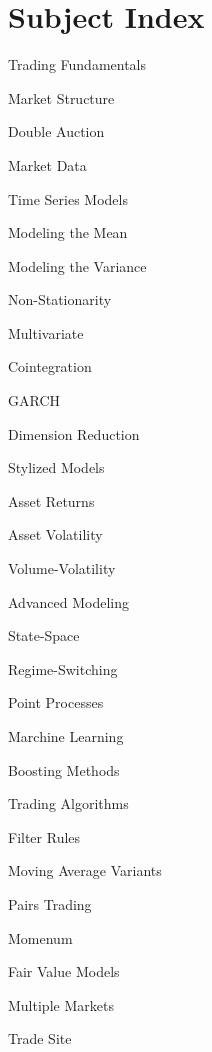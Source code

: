 \chapter*{Subject Index}

\begin{minipage}{0.35\textwidth}
\noindent Trading Fundamentals
	\begin{flushright}
	Market Structure \par
	Double Auction \par
	Market Data
	\end{flushright}
	
\noindent Time Series Models
	\begin{flushright}
	Modeling the Mean \par
	Modeling the Variance \par
	Non-Stationarity \par
	Multivariate \par
	Cointegration \par
	GARCH \par
	Dimension Reduction
	\end{flushright}
	
\noindent Stylized Models
	\begin{flushright}
	Asset Returns \par
	Asset Volatility \par
	Volume-Volatility 
	\end{flushright}
	
\noindent Advanced Modeling
	\begin{flushright}
	State-Space \par
	Regime-Switching \par
	Point Processes \par
	Marchine Learning \par
	Boosting Methods
	\end{flushright}
	
\noindent Trading Algorithms
	\begin{flushright}
	Filter Rules \par
	Moving Average Variants \par
	Pairs Trading \par
	Momenum \par
	Fair Value Models \par
	Multiple Markets \par
	Trade Site
	\end{flushright}
\end{minipage} \hfill
